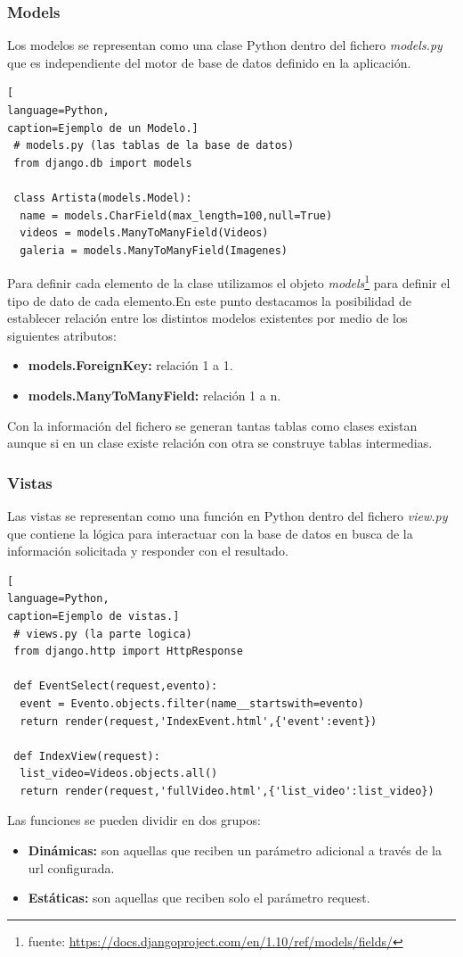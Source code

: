 \subsubsection*{Models}
Los modelos se representan como una clase Python dentro del fichero \textit{models.py } que es independiente del motor de base de datos definido en la aplicación.
\begin{lstlisting}[
language=Python,
caption=Ejemplo de un Modelo.]
 # models.py (las tablas de la base de datos)
 from django.db import models
 
 class Artista(models.Model):
  name = models.CharField(max_length=100,null=True)
  videos = models.ManyToManyField(Videos) 
  galeria = models.ManyToManyField(Imagenes)

\end{lstlisting}
Para definir cada elemento de la clase utilizamos el objeto \textit{models}\footnote{fuente: \url{https://docs.djangoproject.com/en/1.10/ref/models/fields/}} para definir el tipo de dato de cada elemento.En este punto destacamos la posibilidad de establecer relación entre los distintos modelos existentes por medio de los siguientes atributos:
\begin{itemize}
\item \textbf{models.ForeignKey:} relación 1 a 1.
\item\textbf{ models.ManyToManyField:} relación 1 a n.
\end{itemize}
Con la información del fichero se generan tantas tablas como clases existan aunque si en un clase existe relación con otra se construye tablas intermedias.
\subsubsection*{Vistas}
Las vistas se representan como una función en Python dentro del fichero \textit{view.py} que contiene la lógica para interactuar con la base de datos en busca de la información solicitada y responder con el resultado.
\begin{lstlisting}[
language=Python,
caption=Ejemplo de vistas.]
 # views.py (la parte logica)
 from django.http import HttpResponse 
 
 def EventSelect(request,evento):
  event = Evento.objects.filter(name__startswith=evento)
  return render(request,'IndexEvent.html',{'event':event})
    
 def IndexView(request):
  list_video=Videos.objects.all()
  return render(request,'fullVideo.html',{'list_video':list_video})
\end{lstlisting}
Las funciones se pueden dividir en dos grupos:
\begin{itemize}
\item \textbf{Dinámicas:} son aquellas que reciben un parámetro adicional a través de la url configurada.
\item \textbf{Estáticas:} son aquellas que reciben solo el parámetro request.
\end{itemize}
